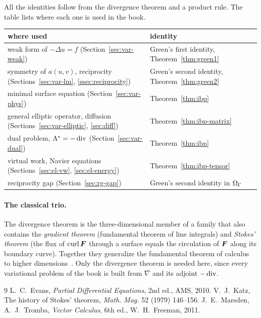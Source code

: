 All the identities follow from the divergence theorem and a product rule.
The table lists where each one is used in the book.
\begin{center}
\renewcommand{\arraystretch}{1.15}
\begin{tabular}{ll}
\toprule
\sffamily where used & \sffamily identity\\
\midrule
weak form of $-\Delta u=f$ (Section~\ref{sec:var-weak}) & Green's first identity, Theorem~\ref{thm:green1}\\
symmetry of $a(u,v)$, reciprocity (Sections~\ref{sec:var-lm}, \ref{ssec:reciprocity}) & Green's second identity, Theorem~\ref{thm:green2}\\
minimal surface equation (Section~\ref{sec:var-phys}) & Theorem~\ref{thm:ibp}\\
general elliptic operator, diffusion (Sections~\ref{sec:var-elliptic}, \ref{sec:diff}) & Theorem~\ref{thm:ibp-matrix}\\
dual problem, $\Lambda^\ast=-\operatorname{div}$ (Section~\ref{sec:var-dual}) & Theorem~\ref{thm:ibp}\\
virtual work, Navier equations (Sections~\ref{sec:el-vw}, \ref{sec:el-energy}) & Theorem~\ref{thm:ibp-tensor}\\
reciprocity gap (Section~\ref{sec:rg-gap}) & Green's second identity in $\Omega_\Gamma$\\
\bottomrule
\end{tabular}
\end{center}

\paragraph{The classical trio.} The divergence theorem is the
three-dimensional member of a family that also contains the \emph{gradient
theorem} (fundamental theorem of line integrals) and \emph{Stokes' theorem}
(the flux of $\operatorname{curl}\bm{F}$ through a surface equals the
circulation of $\bm{F}$ along its boundary curve). Together they generalize the
fundamental theorem of calculus to higher dimensions~\cite{MarsdenTromba2011}.
Only the divergence theorem is needed here, since every variational problem
of the book is built from $\nabla$ and its adjoint $-\operatorname{div}$.

\begin{chapterbib}{9}
 L.~C.~Evans, \emph{Partial Differential Equations}, 2nd ed., AMS, 2010.
 V.~J.~Katz, The history of Stokes' theorem, \emph{Math. Mag.} 52 (1979) 146--156.
 J.~E.~Marsden, A.~J.~Tromba, \emph{Vector Calculus}, 6th ed., W.~H.~Freeman, 2011.
\end{chapterbib}

